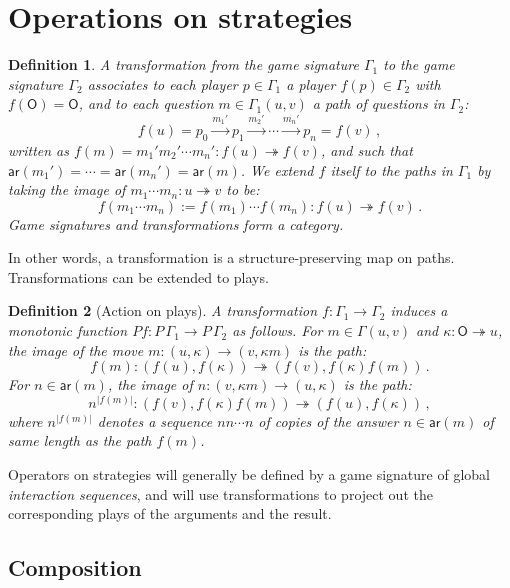 \documentclass[draft,11pt]{report}
\newtheorem{definition}{Definition}
\newcommand{\kw}[1]{\ensuremath{ \mathsf{#1} }}
\begin{document}

\section{Operations on strategies} %

\begin{definition}
A \emph{transformation}
from the game signature $\Gamma_1$
to the game signature $\Gamma_2$
associates to each player $p \in \Gamma_1$ a player $f(p) \in \Gamma_2$
with $f(\kw{O}) = \kw{O}$,
and to each question $m \in \Gamma_1(u,v)$
a \emph{path} of questions in $\Gamma_2$:
\[
  f(u) = p_0 \xrightarrow{m_1'} p_1 \xrightarrow{m_2'} \cdots
             \xrightarrow{m_n'} p_n = f(v) \,,
\]
written as
$f(m) = m_1' m_2' \cdots m_n' : f(u) \twoheadrightarrow f(v)$, and
such that
$\kw{ar}(m_1') = \cdots = \kw{ar}(m_n') = \kw{ar}(m)$.
We extend $f$ itself to the paths in $\Gamma_1$
by taking the image of $m_1 \cdots m_n : u \twoheadrightarrow v$
to be:
\[
  f(m_1 \cdots m_n) := f(m_1) \cdots f(m_n) :
    f(u) \twoheadrightarrow f(v) \,.
\]
Game signatures and transformations form a category.
\end{definition}

In other words,
a transformation
is a structure-preserving map on paths.
Transformations can be extended to plays.

\begin{definition}[Action on plays]
A transformation
$f : \Gamma_1 \rightarrow \Gamma_2$
induces a monotonic function
$P f  : P \, \Gamma_1 \rightarrow P \, \Gamma_2$
as follows.
For $m \in \Gamma(u, v)$ and $\kappa : \kw{O} \twoheadrightarrow u$,
the image of the move
$m : (u, \kappa) \rightarrow (v, \kappa m)$
is the path:
\[
 f(m) : (f(u), f(\kappa)) \twoheadrightarrow
        (f(v), f(\kappa) f(m)) \,.
\]
For $n \in \kw{ar}(m)$,
the image of
$n : (v, \kappa m) \rightarrow (u, \kappa)$
is the path:
\[
 n^{|f(m)|} : (f(v), f(\kappa) f(m)) \twoheadrightarrow
              (f(u), f(\kappa)) \,,
\]
where $n^{|f(m)|}$ denotes a sequence $nn \cdots n$
of copies of the answer $n \in \kw{ar}(m)$
of same length as the path $f(m)$.
\end{definition}

Operators on strategies will generally be defined
by a game signature of global \emph{interaction sequences},
and will use transformations to project out
the corresponding plays of the arguments and the result.

\subsection{Composition} %
\end{document}

